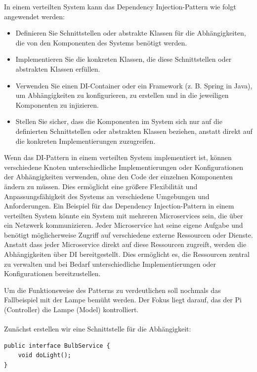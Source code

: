 In einem verteilten System kann das Dependency Injection-Pattern wie folgt angewendet werden:
\begin{itemize}
\item Definieren Sie Schnittstellen oder abstrakte Klassen für die Abhängigkeiten, die von den Komponenten des Systems benötigt werden.
\item Implementieren Sie die konkreten Klassen, die diese Schnittstellen oder abstrakten Klassen erfüllen.
\item Verwenden Sie einen DI-Container oder ein Framework (z. B. Spring in Java), um Abhängigkeiten zu konfigurieren, zu erstellen und in die jeweiligen Komponenten zu injizieren.
\item Stellen Sie sicher, dass die Komponenten im System sich nur auf die definierten Schnittstellen oder abstrakten Klassen beziehen, anstatt direkt auf die konkreten Implementierungen zuzugreifen.
\end{itemize}    
Wenn das DI-Pattern in einem verteilten System implementiert ist, können verschiedene Knoten unterschiedliche Implementierungen oder Konfigurationen der Abhängigkeiten verwenden, ohne den Code der einzelnen Komponenten ändern zu müssen. Dies ermöglicht eine größere Flexibilität und Anpassungsfähigkeit des Systems an verschiedene Umgebungen und Anforderungen. Ein Beispiel für das Dependency Injection-Pattern in einem verteilten System könnte ein System mit mehreren Microservices sein, die über ein Netzwerk kommunizieren. Jeder Microservice hat seine eigene Aufgabe und benötigt möglicherweise Zugriff auf verschiedene externe Ressourcen oder Dienste. Anstatt dass jeder Microservice direkt auf diese Ressourcen zugreift, werden die Abhängigkeiten über DI bereitgestellt. Dies ermöglicht es, die Ressourcen zentral zu verwalten und bei Bedarf unterschiedliche Implementierungen oder Konfigurationen bereitzustellen.

Um die Funktionsweise des Patterns zu verdeutlichen soll nochmals das Fallbeispiel mit der Lampe bemüht werden. Der Fokus liegt darauf, das der Pi (Controller) die Lampe (Model) kontrolliert. 
\\\\
Zunächst erstellen wir eine Schnittstelle für die Abhängigkeit:\\

\noindent\begin{minipage}{\textwidth}
\begin{lstlisting}[caption={Schnittstelle für die Abhängigkeit},captionpos=b,label={lst:di-interface}]
public interface BulbService {
    void doLight();
}
\end{lstlisting}
\end{minipage}

